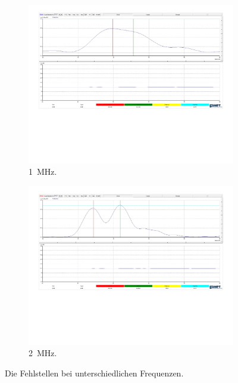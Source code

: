 \begin{figure}[h]%
    \begin{subfigure}{0.48\textwidth}%
        \centering%
        \includegraphics[width=\textwidth]{Messdaten/aufloesung 1mhz zoom.pdf}%
        \caption{\qty{1}{\mega\hertz}.}%
        \label{fig:aufloesung_a}%
    \end{subfigure}%
    \hfill%
    \begin{subfigure}{0.48\textwidth}%
        \centering%
        \includegraphics[width=\textwidth]{Messdaten/aufloesung 2mhz zoom.pdf}%
        \caption{\qty{2}{\mega\hertz}.}%
        \label{fig:aufloesung_b}%
    \end{subfigure}%
    \caption{Die Fehlstellen bei unterschiedlichen Frequenzen.}%
    \label{fig:aufloesung}%
\end{figure}%

